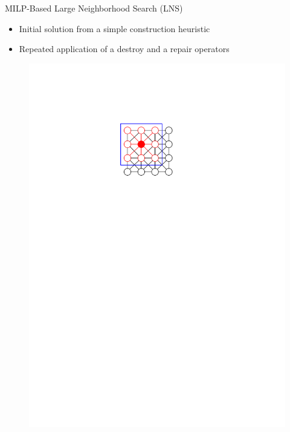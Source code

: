 \documentclass[aspectratio=1610]{beamer}
\newcommand{\important}[1]{{\color{green!60!black}#1}}
\begin{document}
\begin{frame}{MILP-Based Large Neighborhood Search (LNS)}
	\begin{itemize}
		\item Initial solution from a simple construction heuristic
		\item Repeated application of a \important{destroy} and a \important{repair} operators
	\end{itemize}
	\begin{figure}
		\begin{overprint}
			\centering\includegraphics[width=\textwidth, page=10]{figures/graphics.pdf}

\end{overprint}
\end{figure}
\end{frame}
\end{document}
